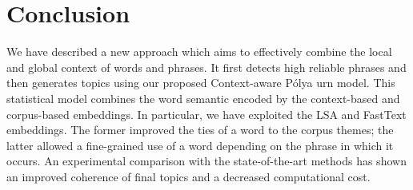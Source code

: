 \documentclass[letterpaper]{article}
\begin{document}
\section{Conclusion}

We have described a new approach which aims to effectively combine the local and global context of words and phrases. It first detects high reliable phrases and then generates topics using our proposed Context-aware P\'{o}lya urn model. This statistical model combines the word semantic encoded by the context-based and corpus-based embeddings. In particular, we have exploited the LSA and FastText embeddings. The former improved the ties of a word to the corpus themes; the latter allowed a fine-grained use of a word depending on the phrase in which it occurs. An experimental comparison with the state-of-the-art methods has shown an improved coherence of final topics and a decreased computational cost.








\end{document}
